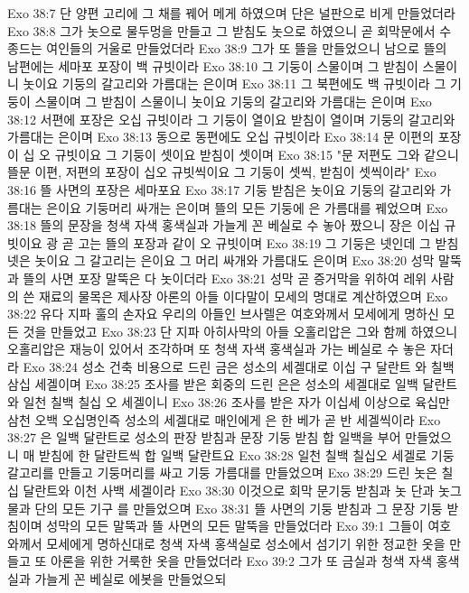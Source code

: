 Exo 38:7  단 양편 고리에 그 채를 꿰어 메게 하였으며 단은 널판으로 비게 만들었더라
Exo 38:8  그가 놋으로 물두멍을 만들고 그 받침도 놋으로 하였으니 곧 회막문에서 수종드는 여인들의 거울로 만들었더라
Exo 38:9  그가 또 뜰을 만들었으니 남으로 뜰의 남편에는 세마포 포장이 백 규빗이라
Exo 38:10  그 기둥이 스물이며 그 받침이 스물이니 놋이요 기둥의 갈고리와 가름대는 은이며
Exo 38:11  그 북편에도 백 규빗이라 그 기둥이 스물이며 그 받침이 스물이니 놋이요 기둥의 갈고리와 가름대는 은이며
Exo 38:12  서편에 포장은 오십 규빗이라 그 기둥이 열이요 받침이 열이며 기둥의 갈고리와 가름대는 은이며
Exo 38:13  동으로 동편에도 오십 규빗이라
Exo 38:14  문 이편의 포장이 십 오 규빗이요 그 기둥이 셋이요 받침이 셋이며
Exo 38:15  "문 저편도 그와 같으니 뜰문 이편, 저편의 포장이 십오 규빗씩이요 그 기둥이 셋씩, 받침이 셋씩이라"
Exo 38:16  뜰 사면의 포장은 세마포요
Exo 38:17  기둥 받침은 놋이요 기둥의 갈고리와 가름대는 은이요 기둥머리 싸개는 은이며 뜰의 모든 기둥에 은 가름대를 꿰었으며
Exo 38:18  뜰의 문장을 청색 자색 홍색실과 가늘게 꼰 베실로 수 놓아 짰으니 장은 이십 규빗이요 광 곧 고는 뜰의 포장과 같이 오 규빗이며
Exo 38:19  그 기둥은 넷인데 그 받침 넷은 놋이요 그 갈고리는 은이요 그 머리 싸개와 가름대도 은이며
Exo 38:20  성막 말뚝과 뜰의 사면 포장 말뚝은 다 놋이더라
Exo 38:21  성막 곧 증거막을 위하여 레위 사람의 쓴 재료의 물목은 제사장 아론의 아들 이다말이 모세의 명대로 계산하였으며
Exo 38:22  유다 지파 훌의 손자요 우리의 아들인 브사렐은 여호와께서 모세에게 명하신 모든 것을 만들었고
Exo 38:23  단 지파 아히사막의 아들 오홀리압은 그와 함께 하였으니 오홀리압은 재능이 있어서 조각하며 또 청색 자색 홍색실과 가는 베실로 수 놓은 자더라
Exo 38:24  성소 건축 비용으로 드린 금은 성소의 세겔대로 이십 구 달란트 와 칠백 삼십 세겔이며
Exo 38:25  조사를 받은 회중의 드린 은은 성소의 세겔대로 일백 달란트와 일천 칠백 칠십 오 세겔이니
Exo 38:26  조사를 받은 자가 이십세 이상으로 육십만 삼천 오백 오십명인즉 성소의 세겔대로 매인에게 은 한 베가 곧 반 세겔씩이라
Exo 38:27  은 일백 달란트로 성소의 판장 받침과 문장 기둥 받침 합 일백을 부어 만들었으니 매 받침에 한 달란트씩 합 일백 달란트요
Exo 38:28  일천 칠백 칠십오 세겔로 기둥 갈고리를 만들고 기둥머리를 싸고 기둥 가름대를 만들었으며
Exo 38:29  드린 놋은 칠십 달란트와 이천 사백 세겔이라
Exo 38:30  이것으로 회막 문기둥 받침과 놋 단과 놋그물과 단의 모든 기구 를 만들었으며
Exo 38:31  뜰 사면의 기둥 받침과 그 문장 기둥 받침이며 성막의 모든 말뚝과 뜰 사면의 모든 말뚝을 만들었더라
Exo 39:1  그들이 여호와께서 모세에게 명하신대로 청색 자색 홍색실로 성소에서 섬기기 위한 정교한 옷을 만들고 또 아론을 위한 거룩한 옷을 만들었더라
Exo 39:2  그가 또 금실과 청색 자색 홍색실과 가늘게 꼰 베실로 에봇을 만들었으되

